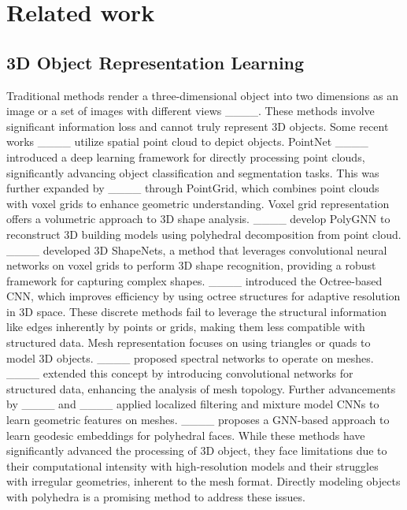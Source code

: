 \section{Related work}
\subsection{3D Object Representation Learning}
Traditional methods render a three-dimensional object into two dimensions as an image or a set of images with different views ____. These methods involve significant information loss and cannot truly represent 3D objects. Some recent works ____ utilize spatial point cloud to depict objects. PointNet ____ introduced a deep learning framework for directly processing point clouds, significantly advancing object classification and segmentation tasks. This was further expanded by ____ through PointGrid, which combines point clouds with voxel grids to enhance geometric understanding. Voxel grid representation offers a volumetric approach to 3D shape analysis. ____ develop PolyGNN to reconstruct 3D building models using polyhedral decomposition from point cloud. ____ developed 3D ShapeNets, a method that leverages convolutional neural networks on voxel grids to perform 3D shape recognition, providing a robust framework for capturing complex shapes. ____ introduced the Octree-based CNN, which improves efficiency by using octree structures for adaptive resolution in 3D space. These discrete methods fail to leverage the structural information like edges inherently by points or grids, making them less compatible with structured data. 
Mesh representation focuses on using triangles or quads to model 3D objects. ____ proposed spectral networks to operate on meshes. ____ extended this concept by introducing convolutional networks for structured data, enhancing the analysis of mesh topology. Further advancements by ____ and ____ applied localized filtering and mixture model CNNs to learn geometric features on meshes. ____ proposes a GNN-based approach to learn geodesic embeddings for polyhedral faces.  While these methods have significantly advanced the processing of 3D object, they face limitations due to their computational intensity with high-resolution models and their struggles with irregular geometries, inherent to the mesh format. Directly modeling objects with polyhedra is a promising method to address these issues.

